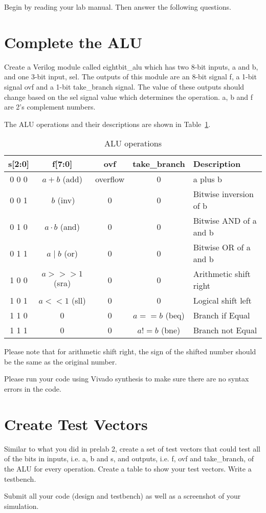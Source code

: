 \documentclass[10pt, oneside]{article}
\begin{document}
\pagestyle{empty}
\noindent
{}

Begin by reading your lab manual. Then answer the following questions.

\section{Complete the ALU}\label{sec:palu}

Create a Verilog module called eightbit\_alu which has two 8-bit inputs, a and b, and one 3-bit input, sel. The outputs of this module are an 8-bit signal f, a 1-bit signal ovf and a 1-bit take\_branch signal. The value of these outputs should change based on the sel signal value which determines the operation. a, b and f are 2's complement numbers. 

The ALU operations and their descriptions are shown in Table~\ref{tab:alu-ops}.

\begin{table}[!htb]
  \centering
  \begin{tabular}{||c||c|c|c|l||} 
\hline \hline
{\bf s[2:0]} & {\bf f[7:0]} & {\bf ovf} & {\bf take\_branch} & {\bf Description} \\ 
\hline 
0 0 0 & $a + b$ (add)         & overflow & 0 & a plus b\\
0 0 1 & $~b$ (inv)         					& 0 			 & 0 & Bitwise inversion of b\\
0 1 0 & $a \cdot b$ (and)  	  & 0        & 0 & Bitwise AND of a and b\\
0 1 1 & $a \mid  b$ (or)    	& 0 			 & 0 & Bitwise OR of a and b\\
1 0 0 & $a >>> 1$ (sra)      				& 0        & 0 & Arithmetic shift right\\
1 0 1 & $a << 1$ (sll)      				& 0        & 0 & Logical shift left\\
1 1 0 & 0 				    & 0        & $a == b$ (beq)  & Branch if Equal\\
1 1 1 & 0  				    & 0        & $a != b$ (bne) & Branch not Equal\\
\hline \hline
  \end{tabular} 
  \caption{ALU operations}
  \label{tab:alu-ops}
\end{table}
Please note that for arithmetic shift right, the sign of the shifted number should be the same as the original number. 

Please run your code using Vivado synthesis to  make sure there are no syntax errors in the code. 

\section{Create Test Vectors}\label{sec:alu}

Similar to what you did in prelab 2, create a set of test vectors that could test all of the bits in inputs, i.e. a, b and s, and outputs, i.e. f, ovf and take\_branch, of the ALU for every operation. Create a table to show your test vectors.  Write a testbench.

Submit all your code (design and testbench) as well as a screenshot of your simulation.  
\end{document}
